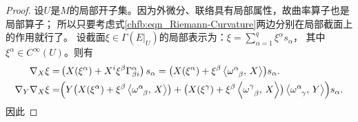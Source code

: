 \begin{proof}
设$U$是$M$的局部开子集。因为外微分、联络具有局部属性，故曲率算子也是局部算子；
所以只要考虑式\eqref{chfb:eqn_Riemann-Curvature}两边分别在局部截面上的作用就行了。
设截面$\xi \in \Gamma(E|_U)$的局部表示为：$\xi =\sum_{\alpha=1}^q \xi^\alpha s_\alpha$，
其中$\xi^\alpha \in C^\infty(U)$。则有
\begin{align*}
    \nabla_X \xi= & \left(X (\xi^\alpha )+ X^i \xi^\beta \Gamma_{\beta i}^\alpha \right) s_\alpha
    = \bigl(X (\xi^\alpha )+ \xi^\beta \left< \omega_{\hphantom{\alpha}\beta}^\alpha,\, X \right> \bigr) s_\alpha . \\
    \nabla_Y \nabla_X \xi= & \Bigl( 
    Y \bigl(X (\xi^\alpha )+ \xi^\beta \left< \omega_{\hphantom{\alpha}\beta}^\alpha,\, X \right> \bigr)+ 
    \bigl(X (\xi^\gamma )+ \xi^\beta \left< \omega_{\hphantom{\alpha}\beta}^\gamma,\, X \right> \bigr)
    \left< \omega_{\hphantom{\alpha}\gamma}^\alpha,\, Y \right> 
    \Bigr) s_\alpha .
\end{align*}
因此


\end{proof}

